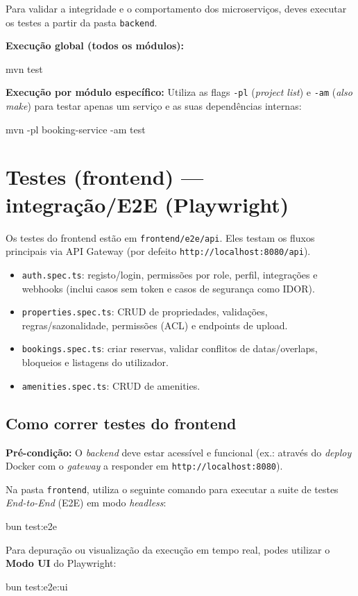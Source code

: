Para validar a integridade e o comportamento dos microserviços, deves executar os testes a partir da pasta \texttt{backend}. 

\textbf{Execução global (todos os módulos):}
\begin{codeblock}
mvn test
\end{codeblock}

\textbf{Execução por módulo específico:}
Utiliza as flags \texttt{-pl} (\textit{project list}) e \texttt{-am} (\textit{also make}) para testar apenas um serviço e as suas dependências internas:

\begin{codeblock}
mvn -pl booking-service -am test
\end{codeblock}

\section{Testes (frontend) — integração/E2E (Playwright)}
Os testes do frontend estão em \texttt{frontend/e2e/api}. Eles testam os fluxos principais via API Gateway (por defeito \texttt{http://localhost:8080/api}).

\begin{itemize}[nosep]
  \item \texttt{auth.spec.ts}: registo/login, permissões por role, perfil, integrações e webhooks (inclui casos sem token e casos de segurança como IDOR).
  \item \texttt{properties.spec.ts}: CRUD de propriedades, validações, regras/sazonalidade, permissões (ACL) e endpoints de upload.
  \item \texttt{bookings.spec.ts}: criar reservas, validar conflitos de datas/overlaps, bloqueios e listagens do utilizador.
  \item \texttt{amenities.spec.ts}: CRUD de amenities.
\end{itemize}
\subsection{Como correr testes do frontend}

\textbf{Pré-condição:} O \textit{backend} deve estar acessível e funcional (ex.: através do \textit{deploy} Docker com o \textit{gateway} a responder em \texttt{http://localhost:8080}).

Na pasta \texttt{frontend}, utiliza o seguinte comando para executar a suite de testes \textit{End-to-End} (E2E) em modo \textit{headless}:

\begin{codeblock}
bun test:e2e
\end{codeblock}

Para depuração ou visualização da execução em tempo real, podes utilizar o \textbf{Modo UI} do Playwright:

\begin{codeblock}
bun test:e2e:ui
\end{codeblock}
